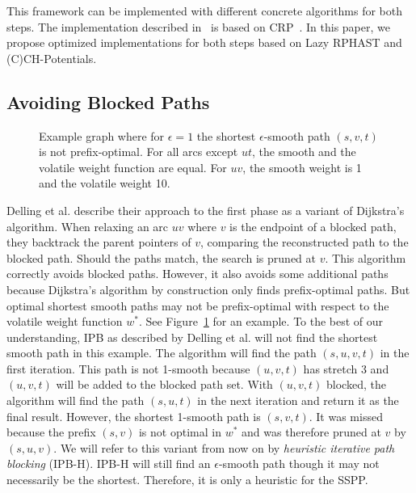 \documentclass[a4paper,UKenglish,cleveref, autoref, thm-restate]{lipics-v2021}
\begin{document}
This framework can be implemented with different concrete algorithms for both steps.
The implementation described in~\cite{dss-tarrn-18} is based on CRP~\cite{dgpw-crprn-13}.
In this paper, we propose optimized implementations for both steps based on Lazy RPHAST and (C)CH-Potentials.

\subsection{Avoiding Blocked Paths}\label{sec:ipb}

\begin{figure}
\centering
{}
\caption{
Example graph where for $\epsilon = 1$ the shortest $\epsilon$-smooth path $(s,v,t)$ is not prefix-optimal. For all arcs except $ut$, the smooth and the volatile weight function are equal. For $uv$, the smooth weight is 1 and the volatile weight 10.
}
\label{fig:ipb_counterexample}
\end{figure}

Delling et al. describe their approach to the first phase as a variant of Dijkstra's algorithm.
When relaxing an arc $uv$ where $v$ is the endpoint of a blocked path, they backtrack the parent pointers of $v$, comparing the reconstructed path to the blocked path.
Should the paths match, the search is pruned at $v$.
This algorithm correctly avoids blocked paths.
However, it also avoids some additional paths because Dijkstra's algorithm by construction only finds prefix-optimal paths.
But optimal shortest smooth paths may not be prefix-optimal with respect to the volatile weight function $w^*$.
See Figure~\ref{fig:ipb_counterexample} for an example.
To the best of our understanding, IPB as described by Delling et al. will not find the shortest smooth path in this example.
The algorithm will find the path $(s,u,v,t)$ in the first iteration.
This path is not 1-smooth because $(u,v,t)$ has stretch 3 and $(u,v,t)$ will be added to the blocked path set.
With $(u,v,t)$ blocked, the algorithm will find the path $(s,u,t)$ in the next iteration and return it as the final result.
However, the shortest 1-smooth path is $(s,v,t)$.
It was missed because the prefix $(s,v)$ is not optimal in $w^*$ and was therefore pruned at $v$ by $(s,u,v)$.
We will refer to this variant from now on by \emph{heuristic iterative path blocking} (IPB-H).
IPB-H will still find an $\epsilon$-smooth path though it may not necessarily be the shortest.
Therefore, it is only a heuristic for the SSPP.
\end{document}
